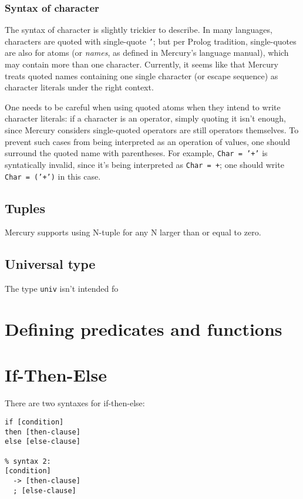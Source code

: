 \subsubsection{Syntax of character}

The syntax of character is slightly trickier to describe. In many languages, characters are quoted with single-quote \texttt{'}; but per Prolog tradition, single-quotes are also for atoms (or \textit{names}, as defined in Mercury's language manual), which may contain more than one character. Currently, it seems like that Mercury treats quoted names containing one single character (or escape sequence) as character literals under the right context.

One needs to be careful when using quoted atoms when they intend to write character literals: if a character is an operator, simply quoting it isn't enough, since Mercury considers single-quoted operators are still operators themselves. To prevent such cases from being interpreted as an operation of values, one should surround the quoted name with parentheses. For example, \texttt{Char = '+'} is syntatically invalid, since it's being interpreted as \texttt{Char = +}; one should write \texttt{Char = ('+')} in this case.

\subsection{Tuples}

Mercury supports using N-tuple for any N larger than or equal to zero.

\subsection{Universal type}

The type \texttt{univ} isn't intended fo


\section{Defining predicates and functions}

\section{If-Then-Else}

There are two syntaxes for if-then-else:

\begin{lstlisting}[language=Mercury]
% syntax 1:
if [condition]
then [then-clause]
else [else-clause]

% syntax 2:
[condition]
  -> [then-clause]
  ; [else-clause]
\end{lstlisting}

